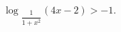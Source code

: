 \begin{ex}[type=inequality]
	\begin{condition}
		$ \log$\tiny$_{\dfrac{1}{1 + x^2}}$\normalsize$(4x - 2)>-1 .$
	\end{condition}
\end{ex}
